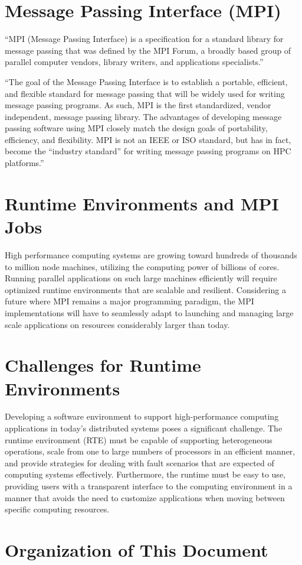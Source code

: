 \section{Message Passing Interface (MPI)}
\label{sec:Introduction}
``MPI (Message Passing Interface) is a specification for a standard library for message passing that was defined by the MPI Forum, a broadly based group of parallel computer vendors, library writers, and applications specialists.''~\cite{gropp1996high}

``The goal of the Message Passing Interface is to establish a portable, efficient, and flexible standard for message passing that will be widely used for writing message passing programs. As such, MPI is the first standardized, vendor independent, message passing library. The advantages of developing message passing software using MPI closely match the design goals of portability, efficiency, and flexibility. MPI is not an IEEE or ISO standard, but has in fact, become the ``industry standard'' for writing message passing programs on HPC platforms.''~\cite{barker2015message}

\section{Runtime Environments and MPI Jobs}
\label{sec:Introduction}
High performance computing systems are growing toward hundreds of thousands to million node machines, utilizing the computing power of billions of cores. Running parallel applications on such large machines efficiently will require optimized runtime environments that are scalable and resilient. Considering a future where MPI remains a major programming paradigm, the MPI implementations will have to seamlessly adapt to launching and managing large scale applications on resources considerably larger than today.~\cite{bosilca2011scalability}

\section{Challenges for Runtime Environments}
\label{sec:Introduction}
Developing a software environment to support high-performance computing applications in today's distributed systems poses a significant challenge. The runtime environment (RTE) must be capable of supporting heterogeneous operations, scale from one to large numbers of processors in an efficient manner, and provide strategies for dealing with fault scenarios that are expected of computing systems effectively. Furthermore, the runtime must be easy to use, providing users with a transparent interface to the computing environment in a manner that avoids the need to customize applications when moving between specific computing resources.~\cite{Castain2008153}

\section{Organization of This Document}
\label{sec:Introduction}

